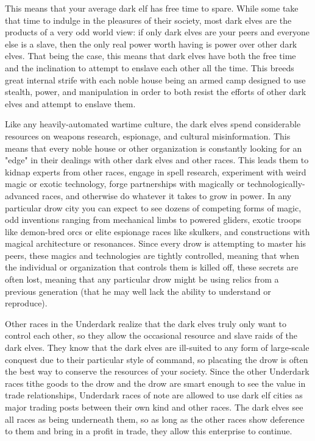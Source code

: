 This means that your average dark elf has free time to spare. While some take that time to indulge in the pleasures of their society, most dark elves are the products of a very odd world view: if only dark elves are your peers and everyone else is a slave, then the only real power worth having is power over other dark elves. That being the case, this means that dark elves have both the free time and the inclination to attempt to enslave each other all the time. This breeds great internal strife with each noble house being an armed camp designed to use stealth, power, and manipulation in order to both resist the efforts of other dark elves and attempt to enslave them.

Like any heavily-automated wartime culture, the dark elves spend considerable resources on weapons research, espionage, and cultural misinformation. This means that every noble house or other organization is constantly looking for an "edge" in their dealings with other dark elves and other races. This leads them to kidnap experts from other races, engage in spell research, experiment with weird magic or exotic technology, forge partnerships with magically or technologically-advanced races, and otherwise do whatever it takes to grow in power. In any particular drow city you can expect to see dozens of competing forms of magic, odd inventions ranging from mechanical limbs to powered gliders, exotic troops like demon-bred orcs or elite espionage races like skulkers, and constructions with magical architecture or resonances. Since every drow is attempting to master his peers, these magics and technologies are tightly controlled, meaning that when the individual or organization that controls them is killed off, these secrets are often lost, meaning that any particular drow might be using relics from a previous generation (that he may well lack the ability to understand or reproduce).

Other races in the Underdark realize that the dark elves truly only want to control each other, so they allow the occasional resource and slave raids of the dark elves. They know that the dark elves are ill-suited to any form of large-scale conquest due to their particular style of command, so placating the drow is often the best way to conserve the resources of your society. Since the other Underdark races tithe goods to the drow and the drow are smart enough to see the value in trade relationships, Underdark races of note are allowed to use dark elf cities as major trading posts between their own kind and other races. The dark elves see all races as being underneath them, so as long as the other races show deference to them and bring in a profit in trade, they allow this enterprise to continue.

